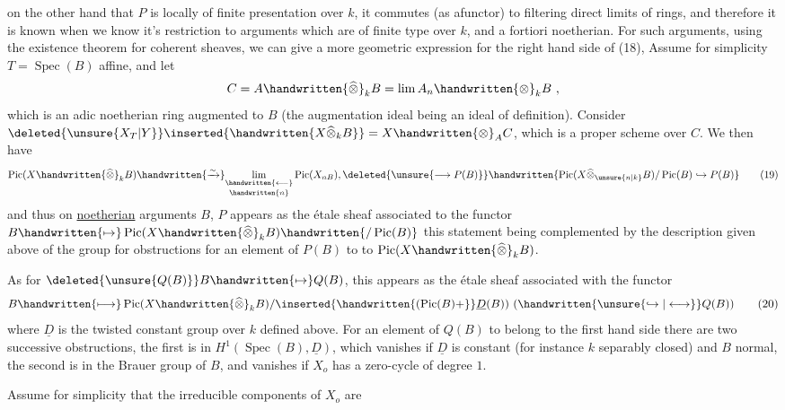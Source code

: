 on the other hand that $P$ is locally of finite presentation over $k$, it commutes (as afunctor) to filtering direct limits of rings, and therefore it is known when we know it's restriction to arguments which are of finite type over $k$, and a fortiori  noetherian. For such  arguments, using the existence theorem for coherent sheaves, we can give a more geometric expression for the right hand side of (18),  Assume for simplicity $T=\operatorname{Spec}(B)$ affine, and let
\[
C=A\handwritten{\widehat{\otimes}}_k B=\lim A_n\handwritten{\otimes}_k B\ ,
\]
which is an adic noetherian ring augmented to $B$ (the augmentation ideal being an ideal of definition). Consider $\deleted{\unsure{X_T|Y}}\inserted{\handwritten{X\widehat{\otimes}_k B}}=X\handwritten{\otimes}_A C$, which is a proper scheme over $C$. We then have
\[
\operatorname{Pic}(X\handwritten{\widehat{\otimes}}_k B)\handwritten{\xrightarrow{\sim}}\underset{\handwritten{n}}{\underset{\handwritten{\longleftarrow}}{\lim}}\operatorname{Pic}(X_{nB}),\deleted{\unsure{\longrightarrow P(B)}}\handwritten{\operatorname{Pic}(X\widehat{\otimes}_{\unsure{n|k}}B)/\operatorname{Pic}(B)\hookrightarrow P(B)}
\tag*{(19)}
\]
and thus on \uline{noetherian} arguments $B$, $P$ appears as the étale sheaf associated to the functor $B\handwritten{\mapsto}\operatorname{Pic}(X\handwritten{\widehat{\otimes}}_k B)\handwritten{/\operatorname{Pic}(B)}$  this statement being complemented by the description given above of the group for obstructions for an element of $P(B)$ to  to $\operatorname{Pic}(X\handwritten{\widehat{\otimes}}_k B)$.

As for $\deleted{\unsure{Q(B)}}B\handwritten{\mapsto}Q(B)$, this appears as the  étale sheaf associated with the functor
\[
B\handwritten{\longmapsto}\operatorname{Pic}(X\handwritten{\widehat{\otimes}}_k B)/\inserted{\handwritten{(\operatorname{Pic}(B)+}}\underline{D}(B))\ (\handwritten{\unsure{\hookrightarrow|\longleftrightarrow}}Q(B))
\tag*{(20)}
\]
where $\underline{D}$ is the twisted constant group over $k$ defined above. For an element of $Q(B)$ to belong to the first hand side there are two successive obstructions, the first is in $H^1(\operatorname{Spec}(B),\underline{D})$, which vanishes  if $\underline{D}$ is constant (for instance $k$ separably closed) and $B$ normal, the second is in the Brauer group of $B$, and vanishes  if $X_o$ has a zero-cycle of degree $1$.

Assume for simplicity that the irreducible components of $X_o$ are

